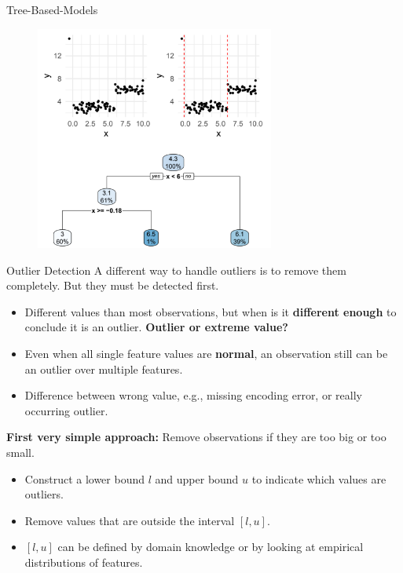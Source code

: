 \begin{vbframe}{Tree-Based-Models}
    \vspace{-0.4cm}
    \begin{figure}
        \includegraphics[width = 0.7\textwidth]{figure_man/tree-based03.png}
    \end{figure}
    
\end{vbframe}

\begin{vbframe}{Outlier Detection}
    A different way to handle outliers is to remove them completely. But they must be detected first.
    \vspace{+.4cm}
    
    \begin{itemize}
        \item Different values than most observations, but when is it \textbf{different enough} to conclude it is an outlier. \textbf{Outlier or extreme value?}
        \item Even when all single feature values are \textbf{normal}, an observation still can be an outlier over multiple features.
        \item Difference between wrong value, e.g., missing encoding error, or really occurring outlier.
    \end{itemize}
    \framebreak 
    
    \textbf{First very simple approach:} Remove observations if they are too big or too small.
    \vspace{+.4cm}
    
    \begin{itemize}
        \item Construct a lower bound $l$ and upper bound $u$ to indicate which values are outliers.
        \item Remove values that are outside the interval $[l, u]$.
        \item $[l, u]$ can be defined by domain knowledge or by looking at empirical distributions of features.
    \end{itemize}
\end{vbframe}

